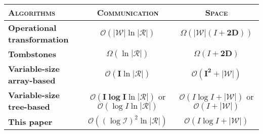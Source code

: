 

\begin{tabular}{@{}lcc@{}}
  \toprule
  \textsc{Algorithms} & \textsc{Communication} & \textsc{Space} \\ \midrule 
  \textbf{Operational transformation~\cite{suleiman1997serialization, sun2009contextbased}} & $\mathcal{O}(\pmb{|\mathcal{W}|}\ln|\mathcal{R}|)$ & $\Omega (\pmb{|\mathcal{W}|}(I+\pmb{2D}))$ \\ \midrule
  \textbf{Tombstones~\cite{ahmed2011evaluating, conway2014language, oster2006data, roh2011replicated, weiss2007wooki, wu2010partial, yu2012stringwise}} & $\Omega (\ln|\mathcal{R}|)$ & $\Omega (I+\pmb{2D})$ \\ \midrule
  \textbf{Variable-size array-based~\cite{weiss2009logoot}} & $\mathcal{O}(\pmb{I}\ln |\mathcal{R}|)$ & $\mathcal{O}(\pmb{I^2+|\mathcal{W}|})$ \\ \midrule
  \textbf{Variable-size tree-based~\cite{preguica2009commutative}} & $\mathcal{O}(\pmb{I\log I} \ln |\mathcal{R}|)$ or $\mathcal{O}(\log I\ln|\mathcal{R}|)$ & $\mathcal{O}(I\log I + \pmb{|\mathcal{W}|})$ or $\mathcal{O}(I + \pmb{|\mathcal{W}|})$ \\ \midrule
  \textbf{This paper~\cite{nedelec2013lseq}} & $\mathcal{O}((\log \mathcal{I})^2\ln|\mathcal{R}|)$ & $\mathcal{O}(I\log I + \pmb{|\mathcal{W}|})$ \\ \bottomrule
\end{tabular}

